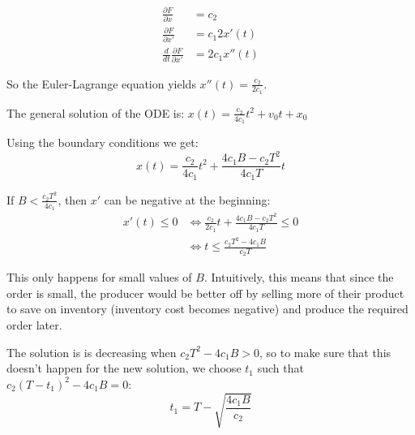 \begin{solution}
\begin{slide}
\begin{parts}

	\item 
		\begin{align*}
			\frac{\partial F}{\partial x} & = c_2 \\
			\frac{\partial F}{\partial x'} & = c_1 2x'(t) \\
			\frac{d}{dt} \frac{\partial F}{\partial x'} & = 2 c_1 x''(t)
		\end{align*}

		So the Euler-Lagrange equation yields $x''(t) = \frac{c_2}{2c_1}$.
		
	\item 		The general solution of the ODE is: 
			$x(t) = \frac{c_2}{4c_1} t^2 + v_0 t + x_0$
			
		Using the boundary conditions we get:
			\[x(t) = \frac{c_2}{4c_1} t^2 + \frac{4c_1 B-c_2 T^2}{4c_1 T} t\]

	\item 		If $B < \frac{c_2 T^2}{4c_1}$, then $x'$ can be negative at the beginning:
		\begin{align*}
			x'(t) \leq 0 	
				& \Leftrightarrow \frac{c_2}{2c_1} t + \frac{4c_1 B-c_2 T^2}{4c_1 T} \leq 0 \\
				& \Leftrightarrow t \leq \frac{c_2 T^2 - 4c_1 B}{c_2T}	
		\end{align*}
		
		This only happens for small values of $B$. Intuitively, this means that since the order is small, the producer would be better off by selling more of their product to save on inventory (inventory cost becomes negative) and produce the required order later.


	
\end{parts}

\end{slide}	



\begin{slide}
\begin{parts}
	\setcounter{partsitem}{3}

	\item The solution is is decreasing when $c_2 T^2 - 4c_1 B > 0$, so to make sure that this doesn't happen for the new solution, we choose $t_1$ such that $c_2 (T-t_1)^2 - 4c_1 B=0$:
		\[ t_1 = T - \sqrt{ \frac{4c_1 B}{c_2}} \]
	

\end{parts}
\end{slide}
\end{solution}
